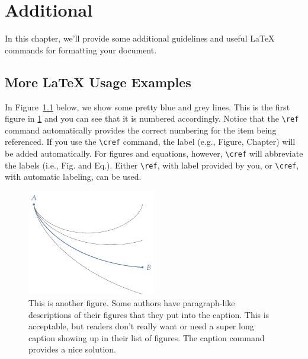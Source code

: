 \chapter{Additional \rmfamily{\LaTeX{}} }
\label{ch:ch2}

In this chapter, we'll provide some additional guidelines and useful \LaTeX{} commands for formatting your document.


\section{More {\rmfamily\LaTeX{}} Usage Examples}
In Figure~\ref{fig:brach2} below, we show some pretty blue and grey lines. This is the first figure in \cref{ch:ch2} and you can see that it is numbered accordingly. Notice that the \verb|\ref| command automatically provides the correct numbering for the item being referenced. If you use the \verb|\cref| command, the label (e.g., Figure, Chapter) will be added automatically. For figures and equations, however, \verb|\cref| will abbreviate the labels (i.e., Fig. and Eq.). Either \verb|\ref|, with label provided by you, or \verb|\cref|, with automatic labeling, can be used. 

\begin{figure}[htbp]
	\centering
	\includegraphics[width=2.2in]{figures/brachistochrone}
	\caption[Short caption to appear in list of figures.]{This is another figure. Some authors have paragraph-like descriptions of their figures that they put into the caption. This is acceptable, but readers don't really want or need a super long caption showing up in their list of figures. The {\ttfamily caption} command provides a nice solution.}
	\label{fig:brach2}
\end{figure}

